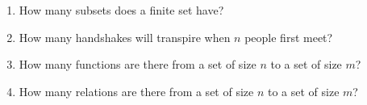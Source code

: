 \begin{enumerate}
\wbvfill

\workbookpagebreak

\item How many subsets does a finite set have?

\wbvfill

\item How many handshakes will transpire when $n$ people first meet?

\wbvfill

\item How many functions are there from a set of size $n$ to a set of size $m$?

\wbvfill

\item How many relations are there from a set of size $n$ to a set of size $m$?

\wbvfill

\workbookpagebreak

\end{enumerate}


